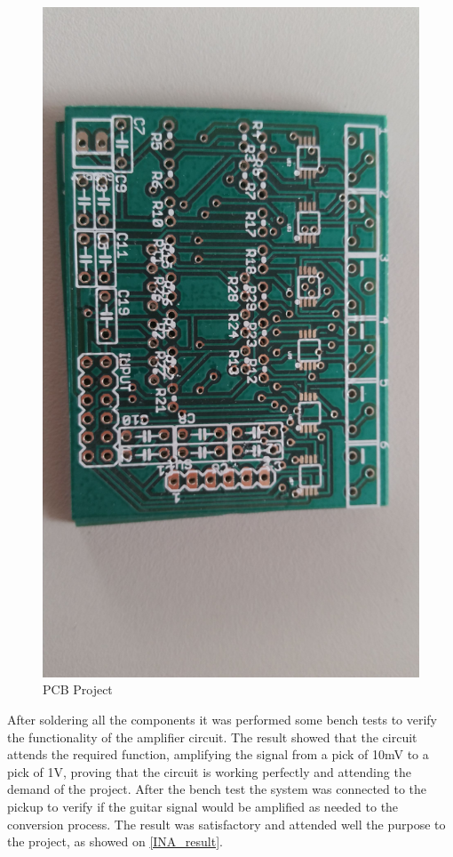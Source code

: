 \begin{figure}[!htpb]
\centering
\caption{PCB Project}
\label{PCB}
\includegraphics[scale=0.08]{images/INA_board}
\end{figure}

After soldering all the components it was performed some bench tests to
verify the functionality of the amplifier circuit. The result showed that the
circuit attends the required function, amplifying the signal from a pick of 10mV
to a pick of 1V, proving that the circuit is working perfectly and attending the
demand of the project. After the bench test the system was connected to the pickup
to verify if the guitar signal would be amplified as needed to the conversion process.
The result was satisfactory and attended well the purpose to the project, as showed on \autoref{INA_result}.


